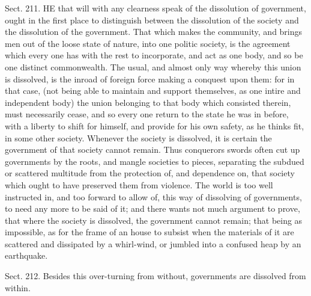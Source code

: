 \documentclass[11pt,openany]{book}
\begin{document}
Sect. 211. HE that will with any clearness speak of the dissolution of government, ought in the first place to distinguish between the dissolution of the society and the dissolution of the government. That which makes the community, and brings men out of the loose state of nature, into one politic society, is the agreement which every one has with the rest to incorporate, and act as one body, and so be one distinct commonwealth. The usual, and almost only way whereby this union is dissolved, is the inroad of foreign force making a conquest upon them: for in that case, (not being able to maintain and support themselves, as one intire and independent body) the union belonging to that body which consisted therein, must necessarily cease, and so every one return to the state he was in before, with a liberty to shift for himself, and provide for his own safety, as he thinks fit, in some other society. Whenever the society is dissolved, it is certain the government of that society cannot remain. Thus conquerors swords often cut up governments by the roots, and mangle societies to pieces, separating the subdued or scattered multitude from the protection of, and dependence on, that society which ought to have preserved them from violence. The world is too well instructed in, and too forward to allow of, this way of dissolving of governments, to need any more to be said of it; and there wants not much argument to prove, that where the society is dissolved, the government cannot remain; that being as impossible, as for the frame of an house to subsist when the materials of it are scattered and dissipated by a whirl-wind, or jumbled into a confused heap by an earthquake.

Sect. 212. Besides this over-turning from without, governments are dissolved from within.
\end{document}
